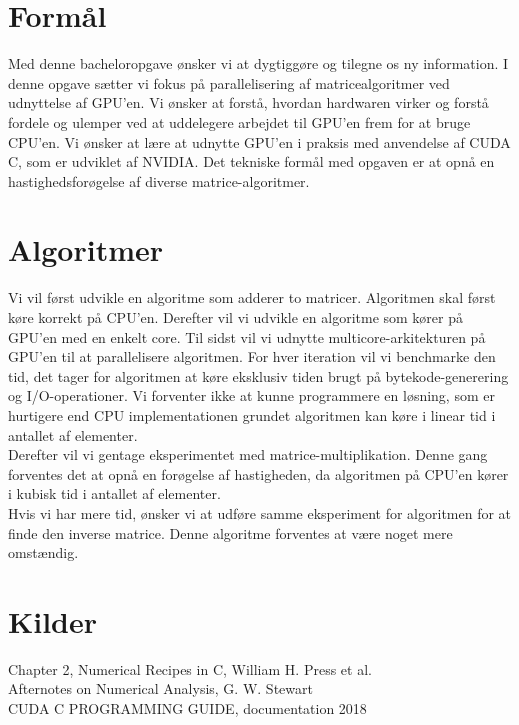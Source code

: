 \section*{Formål}

Med denne bacheloropgave ønsker vi at dygtiggøre og tilegne os ny information. I denne opgave sætter vi fokus på parallelisering af matricealgoritmer ved udnyttelse af GPU'en. Vi ønsker at forstå, hvordan hardwaren virker og forstå fordele og ulemper ved at uddelegere arbejdet til GPU'en frem for at bruge CPU'en. Vi ønsker at lære at udnytte GPU'en i praksis med anvendelse af CUDA C, som er udviklet af NVIDIA. Det tekniske formål med opgaven er at opnå en hastighedsforøgelse af diverse matrice-algoritmer. 

\section*{Algoritmer}
Vi vil først udvikle en algoritme som adderer to matricer. Algoritmen skal først køre korrekt på CPU'en. Derefter vil vi udvikle en algoritme som kører på GPU'en med en enkelt core. Til sidst vil vi udnytte multicore-arkitekturen på GPU'en til at parallelisere algoritmen. For hver iteration vil vi benchmarke den tid, det tager for algoritmen at køre eksklusiv tiden brugt på bytekode-generering og I/O-operationer. Vi forventer ikke at kunne programmere en løsning, som er hurtigere end CPU implementationen grundet algoritmen kan køre i linear tid i antallet af elementer. \\
Derefter vil vi gentage eksperimentet med matrice-multiplikation. Denne gang forventes det at opnå en forøgelse af hastigheden, da algoritmen på CPU'en kører i kubisk tid i antallet af elementer. \\
Hvis vi har mere tid, ønsker vi at udføre samme eksperiment for algoritmen for at finde den inverse matrice. Denne algoritme forventes at være noget mere omstændig. 

\section*{Kilder}
Chapter 2, Numerical Recipes in C, William H. Press et al.\\
Afternotes on Numerical Analysis, G. W. Stewart\\
CUDA C PROGRAMMING GUIDE, documentation 2018\\
